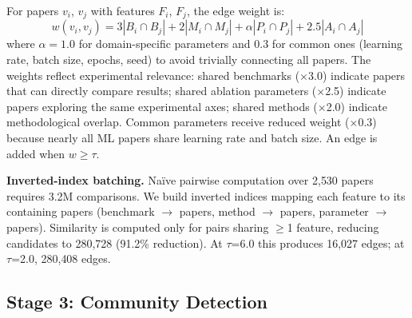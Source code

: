 \documentclass[conference]{IEEEtran}
\begin{document}
For papers $v_i$, $v_j$ with features $F_i$, $F_j$, the edge weight is:
\begin{equation}
w(v_i, v_j) = 3|B_i \!\cap\! B_j| + 2|M_i \!\cap\! M_j| + \alpha|P_i \!\cap\! P_j| + 2.5|A_i \!\cap\! A_j|
\end{equation}
where $\alpha = 1.0$ for domain-specific parameters and $0.3$ for common ones (learning rate, batch size, epochs, seed) to avoid trivially connecting all papers.
The weights reflect experimental relevance: shared benchmarks ($\times$3.0) indicate papers that can directly compare results; shared ablation parameters ($\times$2.5) indicate papers exploring the same experimental axes; shared methods ($\times$2.0) indicate methodological overlap.
Common parameters receive reduced weight ($\times$0.3) because nearly all ML papers share learning rate and batch size.
An edge is added when $w \geq \tau$.

\textbf{Inverted-index batching.}
Na\"ive pairwise computation over 2{,}530 papers requires 3.2M comparisons.
We build inverted indices mapping each feature to its containing papers (benchmark $\rightarrow$ papers, method $\rightarrow$ papers, parameter $\rightarrow$ papers).
Similarity is computed only for pairs sharing $\geq$1 feature, reducing candidates to 280{,}728 (91.2\% reduction).
At $\tau$=6.0 this produces 16{,}027 edges; at $\tau$=2.0, 280{,}408 edges.


\subsection{Stage 3: Community Detection}
\end{document}
